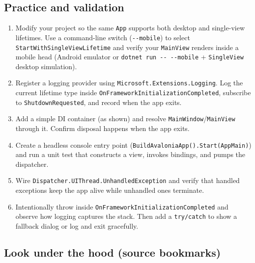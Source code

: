 \subsection{Practice and validation}\label{practice-and-validation-2}

\begin{enumerate}
\def\labelenumi{\arabic{enumi}.}
\tightlist
\item
  Modify your project so the same \passthrough{\lstinline!App!} supports
  both desktop and single-view lifetimes. Use a command-line switch
  (\passthrough{\lstinline!--mobile!}) to select
  \passthrough{\lstinline!StartWithSingleViewLifetime!} and verify your
  \passthrough{\lstinline!MainView!} renders inside a mobile head
  (Android emulator or \passthrough{\lstinline!dotnet run -- --mobile!}
  + \passthrough{\lstinline!SingleView!} desktop simulation).
\item
  Register a logging provider using
  \passthrough{\lstinline!Microsoft.Extensions.Logging!}. Log the
  current lifetime type inside
  \passthrough{\lstinline!OnFrameworkInitializationCompleted!},
  subscribe to \passthrough{\lstinline!ShutdownRequested!}, and record
  when the app exits.
\item
  Add a simple DI container (as shown) and resolve
  \passthrough{\lstinline!MainWindow!}/\passthrough{\lstinline!MainView!}
  through it. Confirm disposal happens when the app exits.
\item
  Create a headless console entry point
  (\passthrough{\lstinline!BuildAvaloniaApp().Start(AppMain)!}) and run
  a unit test that constructs a view, invokes bindings, and pumps the
  dispatcher.
\item
  Wire \passthrough{\lstinline!Dispatcher.UIThread.UnhandledException!}
  and verify that handled exceptions keep the app alive while unhandled
  ones terminate.
\item
  Intentionally throw inside
  \passthrough{\lstinline!OnFrameworkInitializationCompleted!} and
  observe how logging captures the stack. Then add a
  \passthrough{\lstinline!try/catch!} to show a fallback dialog or log
  and exit gracefully.
\end{enumerate}

\subsection{Look under the hood (source
bookmarks)}\label{look-under-the-hood-source-bookmarks-2}

